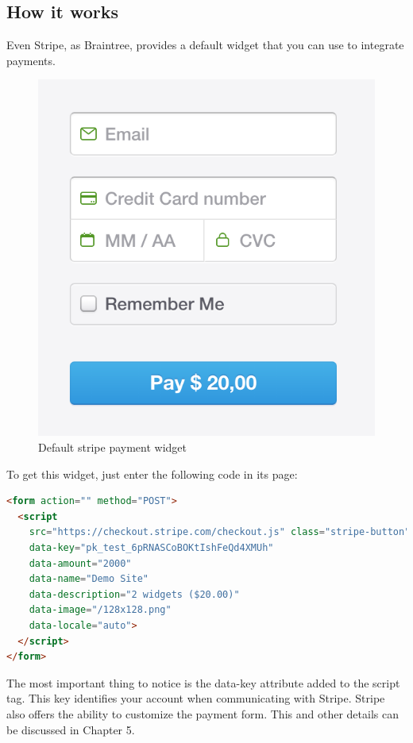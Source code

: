 \subsection{How it works}
Even Stripe, as Braintree, provides a default widget that you can use to integrate payments.
\begin{figure}[htb]
  \centering
  \includegraphics[width=0.5\linewidth]{images/chapter2/stripe-drop.png}\hfill
  \caption[Default stripe payment widget]{Default stripe payment widget}
\label{fig:stripe_default_ui}
\end{figure}
To get this widget, just enter the following code in its page:
\begin{lstlisting}[language=html]
<form action="" method="POST">
  <script
    src="https://checkout.stripe.com/checkout.js" class="stripe-button"
    data-key="pk_test_6pRNASCoBOKtIshFeQd4XMUh"
    data-amount="2000"
    data-name="Demo Site"
    data-description="2 widgets ($20.00)"
    data-image="/128x128.png"
    data-locale="auto">
  </script>
</form>
\end{lstlisting}
The most important thing to notice is the data-key attribute added to the script tag. This key identifies your account when communicating with Stripe.
\newline
Stripe also offers the ability to customize the payment form. This and other details can be discussed in Chapter 5.